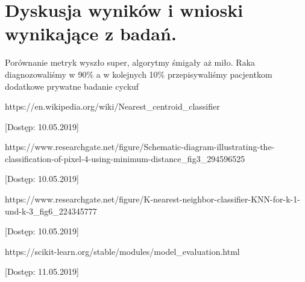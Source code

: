 \documentclass[12pt]{article}
\begin{document}

\section{Dyskusja wyników i wnioski wynikające z badań.}

Porównanie metryk wyszło super, algorytmy śmigały aż miło. Raka diagnozowaliśmy w 90\% a w kolejnych 10\% przepisywaliśmy pacjentkom dodatkowe prywatne badanie cyckuf



\newpage
\renewcommand\refname{Bibliografia}
\begin{thebibliography}{9}

  https://en.wikipedia.org/wiki/Nearest\_centroid\_classifier

[Dostęp: 10.05.2019]

  https://www.researchgate.net/figure/Schematic-diagram-illustrating-the-classification-of-pixel-4-using-minimum-distance\_fig3\_294596525

[Dostęp: 10.05.2019]

  https://www.researchgate.net/figure/K-nearest-neighbor-classifier-KNN-for-k-1-und-k-3\_fig6\_224345777

[Dostęp: 10.05.2019]

  https://scikit-learn.org/stable/modules/model\_evaluation.html

[Dostęp: 11.05.2019]

\end{thebibliography}
\end{document}
